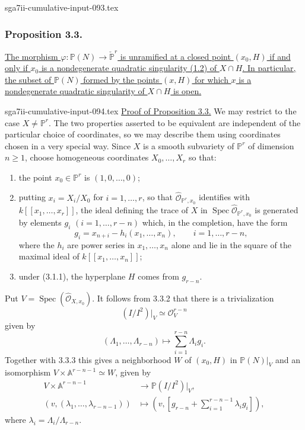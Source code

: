 \begin{filecontents*}{sga7ii-cumulative-input-093.tex}
\subsubsection*{Proposition 3.3.}
\underline{The morphism
$\varphi:\mathbb P(N)\to\check{\mathbb P}^{r}$ is unramified at a
closed point $(x_0,H)$ if and only if $x_0$ is a nondegenerate
quadratic singularity (1.2) of $X\cap H$.  In particular, the subset
of $\mathbb P(N)$ formed by the points $(x,H)$ for which $x$ is a
nondegenerate quadratic singularity of $X\cap H$ is open.}
\end{filecontents*}
\begin{filecontents*}{sga7ii-cumulative-input-094.tex}
\noindent\underline{Proof of Proposition 3.3.}
We may restrict to the case $X\ne\mathbb P^r$.  The two properties
asserted to be equivalent are independent of the particular choice of
coordinates, so we may describe them using coordinates chosen in a
very special way.  Since $X$ is a smooth subvariety of $\mathbb P^r$
of dimension $n\geq1$, choose homogeneous coordinates
$X_0,\ldots,X_r$ so that:
\begin{enumerate}
\item[3.3.1.] the point $x_0\in\mathbb P^r$ is $(1,0,\ldots,0)$;
\item[3.3.2.] putting $x_i=X_i/X_0$ for $i=1,\ldots,r$, so that
$\widehat{\mathcal O}_{\mathbb P^r,x_0}$ identifies with
$k[[x_1,\ldots,x_r]]$, the ideal defining the trace of $X$ in
$\operatorname{Spec}\widehat{\mathcal O}_{\mathbb P^r,x_0}$ is
generated by elements $g_i$ $(i=1,\ldots,r-n)$ which, in the
completion, have the form
\[
g_i=x_{n+i}-h_i(x_1,\ldots,x_n),
\qquad i=1,\ldots,r-n,
\]
where the $h_i$ are power series in $x_1,\ldots,x_n$ alone and lie in
the square of the maximal ideal of $k[[x_1,\ldots,x_n]]$;
\item[3.3.3.] under (3.1.1), the hyperplane $H$ comes from
$g_{r-n}$.
\end{enumerate}

Put $V=\operatorname{Spec}(\widehat{\mathcal O}_{X,x_0})$.  It follows
from 3.3.2 that there is a trivialization
\[
(I/I^2)|_V\simeq\mathcal O_V^{r-n}
\]
given by
\begin{equation}\tag{3.3.4}
(\Lambda_1,\ldots,\Lambda_{r-n})\longmapsto
\sum_{i=1}^{r-n}\Lambda_i g_i.
\end{equation}
Together with 3.3.3 this gives a neighborhood $W$ of $(x_0,H)$ in
$\mathbb P(N)|_V$ and an isomorphism
$V\times\mathbb A^{r-n-1}\simeq W$, given by
\begin{equation}\tag{3.3.5}
\begin{aligned}
V\times\mathbb A^{r-n-1}&\longrightarrow\mathbb P(I/I^2)|_V,\\
(v,(\lambda_1,\ldots,\lambda_{r-n-1}))&\longmapsto
\left(v,\left[g_{r-n}+\sum_{i=1}^{r-n-1}\lambda_i g_i\right]\right),
\end{aligned}
\end{equation}
where $\lambda_i=\Lambda_i/\Lambda_{r-n}$.


\end{filecontents*}
